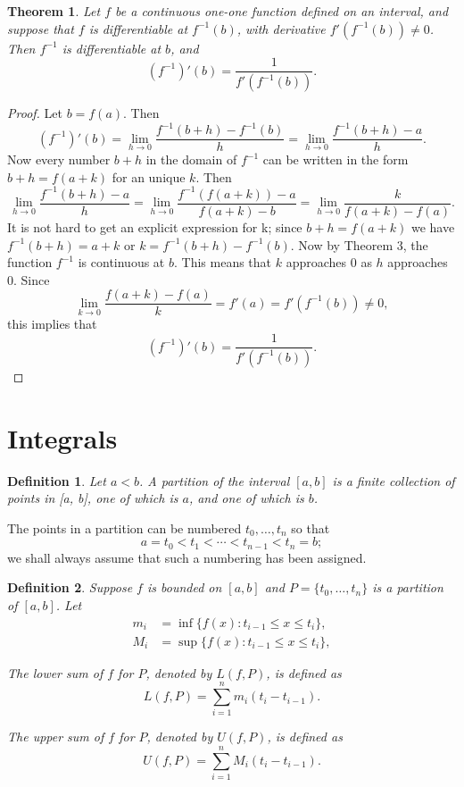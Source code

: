 \documentclass{article}
\numberwithin{corollary}{subsection}
\newtheorem{definition}{Definition}
\numberwithin{definition}{subsection}
\numberwithin{lemma}{subsection}
\newtheorem{theorem}{Theorem}
\numberwithin{theorem}{subsection}
\begin{document}
\begin{theorem}
  Let $f$ be a continuous one-one function defined on an interval, and suppose
  that $f$ is differentiable at $f^{-1}(b)$, with derivative $f'(f^{-1}(b))
  \neq 0$. Then $f^{-1}$ is differentiable at $b$, and \[
    (f^{-1})'(b) = \frac{1}{f'(f^{-1}(b))}.
  \]
\end{theorem}
\begin{proof}
  Let $b = f(a)$. Then \[
    (f^{-1})'(b)
    = \lim_{h \to 0} \frac{f^{-1}(b + h) - f^{-1}(b)}{h}
    = \lim_{h \to 0} \frac{f^{-1}(b + h) - a}{h}.
  \] Now every number $b + h$ in the domain of $f^{-1}$ can be written in the
  form $b + h = f(a + k)$ for an unique $k$. Then \[
    \lim_{h \to 0} \frac{f^{-1}(b + h) - a}{h}
    = \lim_{h \to 0} \frac{f^{-1}(f(a + k)) - a}{f(a + k) - b}
    = \lim_{h \to 0} \frac{k}{f(a + k) - f(a)}.
  \] It is not hard to get an explicit expression for k; since $b + h =
  f(a + k)$ we have $f^{-1}(b + h) = a + k$ or $k = f^{-1}(b + h) - f^{-1}(b)$.
  Now by Theorem 3, the function $f^{-1}$ is continuous at $b$. This means that
  $k$ approaches 0 as $h$ approaches 0. Since \[
    \lim_{k \to 0} \frac{f(a + k) - f(a)}{k} = f'(a) = f'(f^{-1}(b)) \neq 0,
  \] this implies that \[
    (f^{-1})'(b) = \frac{1}{f'(f^{-1}(b))}.
  \]
\end{proof}

\section{Integrals}

\begin{definition}
  Let $a < b$. A \emph{partition} of the interval $[a, b]$ is a finite
  collection of points in [a, b], one of which is $a$, and one of which is $b$.
\end{definition}

The points in a partition can be numbered $t_0, \ldots, t_n$ so that \[
  a = t_0 < t_1 < \cdots < t_{n - 1} < t_n = b;
\] we shall always assume that such a numbering has been assigned.

\begin{definition}
  Suppose $f$ is bounded on $[a, b]$ and $P = \{t_0, \ldots, t_n\}$ is a
  partition of $[a, b]$. Let
  \begin{align*}
    m_i &= \inf\{f(x): t_{i - 1} \leq x \leq t_i\}, \\
    M_i &= \sup\{f(x): t_{i - 1} \leq x \leq t_i\},
  \end{align*}

  The \emph{lower sum} of $f$ for $P$, denoted by $L(f, P)$, is defined as \[
    L(f, P) = \sum_{i = 1}^n m_i(t_i - t_{i - 1}).
  \]

  The \emph{upper sum} of $f$ for $P$, denoted by $U(f, P)$, is defined as \[
    U(f, P) = \sum_{i = 1}^n M_i(t_i - t_{i - 1}).
  \]
\end{definition}
\end{document}
